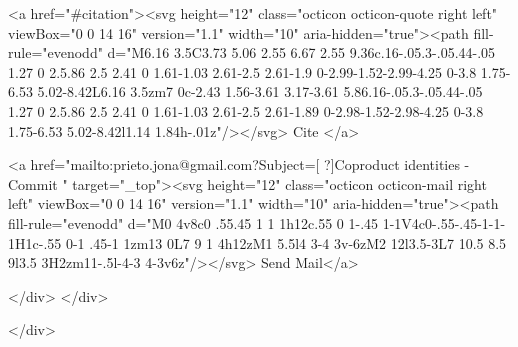       <a  href="#citation"><svg height="12" class="octicon octicon-quote right left" viewBox="0 0 14 16" version="1.1" width="10" aria-hidden="true"><path fill-rule="evenodd" d="M6.16 3.5C3.73 5.06 2.55 6.67 2.55 9.36c.16-.05.3-.05.44-.05 1.27 0 2.5.86 2.5 2.41 0 1.61-1.03 2.61-2.5 2.61-1.9 0-2.99-1.52-2.99-4.25 0-3.8 1.75-6.53 5.02-8.42L6.16 3.5zm7 0c-2.43 1.56-3.61 3.17-3.61 5.86.16-.05.3-.05.44-.05 1.27 0 2.5.86 2.5 2.41 0 1.61-1.03 2.61-2.5 2.61-1.89 0-2.98-1.52-2.98-4.25 0-3.8 1.75-6.53 5.02-8.42l1.14 1.84h-.01z"/></svg> Cite
      </a>

      <a href="mailto:prieto.jona@gmail.com?Subject=[ ?]Coproduct identities - Commit " target="_top"><svg height="12" class="octicon octicon-mail right left" viewBox="0 0 14 16" version="1.1" width="10" aria-hidden="true"><path fill-rule="evenodd" d="M0 4v8c0 .55.45 1 1 1h12c.55 0 1-.45 1-1V4c0-.55-.45-1-1-1H1c-.55 0-1 .45-1 1zm13 0L7 9 1 4h12zM1 5.5l4 3-4 3v-6zM2 12l3.5-3L7 10.5 8.5 9l3.5 3H2zm11-.5l-4-3 4-3v6z"/></svg> Send Mail</a>

    </div>
  </div>

</div>




